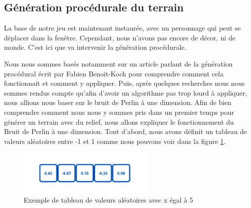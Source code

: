 \documentclass[12pt]{article}
\begin{document}
\subsection{Génération procédurale du terrain}

La base de notre jeu est maintenant instaurée, avec un personnage qui peut se déplacer dans la fenêtre. Cependant, nous n'avons pas encore de décor, ni de monde. C'est ici que va intervenir la génération procédurale.\par
Nous nous sommes basés notamment sur un article parlant de la génération procédural écrit par Fabien Benoit-Koch \cite{benoitkoch} pour comprendre comment cela fonctionnait et comment y appliquer.
Puis, après quelques recherches nous nous sommes rendus compte qu'afin d'avoir un algorithme pas trop lourd à appliquer, nous allions nous baser sur le bruit de Perlin à une dimension.
Afin de bien comprendre comment nous nous y sommes pris dans un premier temps pour générer un terrain avec du relief, nous allons expliquer le fonctionnement du Bruit de Perlin à une dimension. Tout d'abord, nous avons définit un tableau de valeurs aléatoires entre -1 et 1 comme nous pouvons voir dans la figure \ref{tableau}.\par

\begin{figure}[!h]
  \centering
  \includegraphics[width=0.6\textwidth]{assets/tableau.png}
  \caption{Exemple de tableau de valeurs aléatoires avec x égal à 5}
  \label{tableau}
\end{figure}
\end{document}
